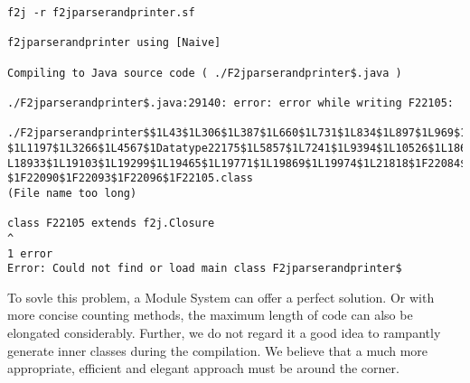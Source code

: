 \begin{itemize}
\begin{lstlisting}
f2j -r f2jparserandprinter.sf

f2jparserandprinter using [Naive]

Compiling to Java source code ( ./F2jparserandprinter$.java )

./F2jparserandprinter$.java:29140: error: error while writing F22105:

./F2jparserandprinter$$1L43$1L306$1L387$1L660$1L731$1L834$1L897$1L969$1L1050
$1L1197$1L3266$1L4567$1Datatype22175$1L5857$1L7241$1L9394$1L10526$1L18657$1
L18933$1L19103$1L19299$1L19465$1L19771$1L19869$1L19974$1L21818$1F22084$1F22087
$1F22090$1F22093$1F22096$1F22105.class
(File name too long)

class F22105 extends f2j.Closure
^
1 error
Error: Could not find or load main class F2jparserandprinter$
\end{lstlisting}

To sovle this problem, a Module System can offer a perfect solution. Or with more concise counting methods, the maximum length of code can also be elongated considerably. Further, we do not regard it a good idea to rampantly generate inner classes during the compilation. We believe that a much more appropriate, efficient and elegant approach must be around the corner.

\end{itemize}
